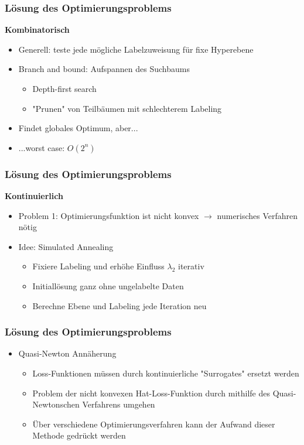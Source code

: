 \documentclass{beamer}
\begin{document}
\begin{frame}
    \frametitle{L\"osung des Optimierungsproblems}
    \textbf{Kombinatorisch}
    \begin{itemize}
        \item Generell: teste jede mögliche Labelzuweisung f\"ur fixe Hyperebene
        \item Branch and bound: Aufspannen des Suchbaums
        \begin{itemize}
        	\item Depth-first search
        	\item "Prunen" von Teilb\"aumen mit schlechterem Labeling
        \end{itemize}
        \item Findet globales Optimum, aber...
        \item ...worst case: $O(2^n)$
    \end{itemize}
\end{frame}

\begin{frame}
	\frametitle{L\"osung des Optimierungsproblems}
	\textbf{Kontinuierlich}
	\begin{itemize}
		\item Problem 1: Optimierungsfunktion ist nicht konvex $\rightarrow$ numerisches Verfahren n\"otig
		\item Idee: Simulated Annealing
		\begin{itemize}
			\item Fixiere Labeling und erh\"ohe Einfluss $\lambda_2$ iterativ
			\item Initiall\"osung ganz ohne ungelabelte Daten
			\item Berechne Ebene und Labeling jede Iteration neu
		\end{itemize}
	\end{itemize}
\end{frame}

\begin{frame}
    \frametitle{L\"osung des Optimierungsproblems}
    \begin{itemize}
        \item Quasi-Newton Ann\"aherung
        \begin{itemize}
            \item Loss-Funktionen m\"ussen durch kontinuierliche "Surrogates" ersetzt werden
            \item Problem der nicht konvexen Hat-Loss-Funktion durch mithilfe des Quasi-Newtonschen Verfahrens umgehen
            \item \"Uber verschiedene Optimierungsverfahren kann der Aufwand dieser Methode gedr\"uckt werden
        \end{itemize}
    \end{itemize}
\end{frame}
\end{document}
